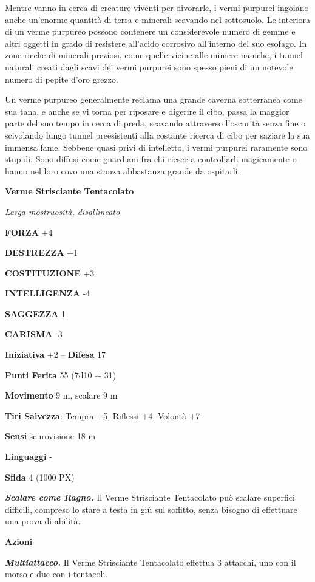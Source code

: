 \begin{multicols}{2}
Mentre vanno in cerca di creature viventi per divorarle, i vermi purpurei ingoiano anche un'enorme quantità di terra e minerali scavando nel sottosuolo. Le interiora di un verme purpureo possono contenere un considerevole numero di gemme e altri oggetti in grado di resistere all'acido corrosivo all'interno del suo esofago. In zone ricche di minerali preziosi, come quelle vicine alle miniere naniche, i tunnel naturali creati dagli scavi dei vermi purpurei sono spesso pieni di un notevole numero di pepite d'oro grezzo.

Un verme purpureo generalmente reclama una grande caverna sotterranea come sua tana, e anche se vi torna per riposare e digerire il cibo, passa la maggior parte del suo tempo in cerca di preda, scavando attraverso l'oscurità senza fine o scivolando lungo tunnel preesistenti alla costante ricerca di cibo per saziare la sua immensa fame. Sebbene quasi privi di intelletto, i vermi purpurei raramente sono stupidi. Sono diffusi come guardiani fra chi riesce a controllarli magicamente o hanno nel loro covo una stanza abbastanza grande da ospitarli.


\medskip{}\textbf{Verme Strisciante Tentacolato}

\textit{Larga mostruosità, disallineato}

\textbf{FORZA} +4

\textbf{DESTREZZA} +1

\textbf{COSTITUZIONE} +3

\textbf{INTELLIGENZA} -4

\textbf{SAGGEZZA} 1

\textbf{CARISMA} -3

\textbf{Iniziativa} +2 -- \textbf{Difesa} 17

\textbf{Punti Ferita} 55 (7d10 + 31)

\textbf{Movimento} 9 m, scalare 9 m

\textbf{Tiri Salvezza}: Tempra +5, Riflessi +4, Volontà +7

\textbf{Sensi} scurovisione 18 m

\textbf{Linguaggi} -

\textbf{Sfida} 4 (1000 PX)

\textit{\textbf{Scalare come Ragno.}} Il Verme Strisciante Tentacolato può scalare superfici difficili, compreso lo stare a testa in giù sul soffitto, senza bisogno di effettuare una prova di abilità.

\textbf{Azioni}

\textit{\textbf{Multiattacco.}} Il Verme Strisciante Tentacolato effettua 3 attacchi, uno con il morso e due con i tentacoli.


\end{multicols}
